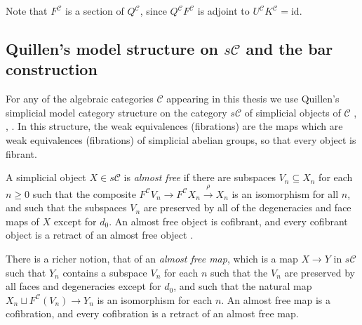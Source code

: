 \documentclass[11pt]{amsart} \renewcommand{\baselinestretch}{1.2}
\theoremstyle{plain}
\numberwithin{equation}{section} %
\theoremstyle{plain}
\numberwithin{equation}{chapter} %
\renewcommand{\to}{\longrightarrow}
\newcommand{\calc}{\mathcal{C}}
\newcommand{\citeBOX}[2][]{\cite[\mbox{#1}]{#2}}
\newcommand{\Id}{\mathrm{id}}
\newcommand{\SubsectionOrSection}[1]{\subsection{#1}}
\begin{document}
\begin{Conventions and notation}
Note that $F^\calc$ is a section of $Q^{\calc}$, since $Q^{\calc} F^{\calc}$ is adjoint to $U^\calc K^\calc=\Id$.

\SubsectionOrSection{Quillen's model structure on $s\calc$ and the bar construction}\label{ssec: quillen model and bar construction}
For any of the algebraic categories $\calc$ appearing in this thesis we use Quillen's simplicial model category structure on the category $s\calc$ of simplicial objects of $\calc$ \cite{QuillenHomAlg.pdf}, \cite{MillerSullivanConjecture.pdf},  \cite{Blanc_Stover-Groth_SS.pdf}. In this structure, the weak equivalences (fibrations) are the maps which are weak equivalences (fibrations) of simplicial abelian groups, so that every object is fibrant. 

 A simplicial object $X\in s\calc$ is \emph{almost free} if there are subspaces $V_n\subseteq X_n$ for each $n\geq0$ such that the composite $F^\calc  V_n\to F^\calc  X_n\overset{\rho}{\to} X_n$ is an isomorphism for all $n$, and such that the subspaces $V_n$ are preserved by all of the degeneracies and face maps of $X$ except for $d_0$. An almost free object is cofibrant, and every cofibrant object is a retract of an almost free object \citeBOX[\S3]{MillerSullivanConjecture.pdf}. 

There is a richer notion, that of an \emph{almost free map}, which is  a map $X\to Y$ in $s\calc$ such that $Y_n$ contains a subspace $V_n$ for each $n$ such that the $V_n$ are preserved by all faces and degeneracies except for $d_0$, and such that the natural map $X_n\sqcup F^\calc(V_n) \to Y_n$ is an isomorphism for each $n$. An almost free map is a cofibration, and every cofibration is a retract of an almost free map.


\end{Conventions and notation}
\end{document}
